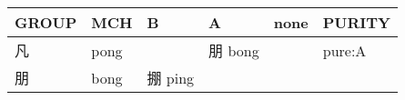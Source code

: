 \documentclass[14pt,a4paper]{scrartcl}
\begin{document}
\begin{longtable}[c]{@{}llllll@{}}
\toprule
\begin{minipage}[b]{0.14\columnwidth}\raggedright\strut
GROUP
\strut\end{minipage} &
\begin{minipage}[b]{0.14\columnwidth}\raggedright\strut
MCH
\strut\end{minipage} &
\begin{minipage}[b]{0.14\columnwidth}\raggedright\strut
B
\strut\end{minipage} &
\begin{minipage}[b]{0.14\columnwidth}\raggedright\strut
A
\strut\end{minipage} &
\begin{minipage}[b]{0.14\columnwidth}\raggedright\strut
none
\strut\end{minipage} &
\begin{minipage}[b]{0.14\columnwidth}\raggedright\strut
PURITY
\strut\end{minipage}\tabularnewline
\midrule
\endhead
\begin{minipage}[t]{0.14\columnwidth}\raggedright\strut
凡
\strut\end{minipage} &
\begin{minipage}[t]{0.14\columnwidth}\raggedright\strut
pong
\strut\end{minipage} &
\begin{minipage}[t]{0.14\columnwidth}\raggedright\strut
\strut\end{minipage} &
\begin{minipage}[t]{0.14\columnwidth}\raggedright\strut
朋 bong
\strut\end{minipage} &
\begin{minipage}[t]{0.14\columnwidth}\raggedright\strut
\strut\end{minipage} &
\begin{minipage}[t]{0.14\columnwidth}\raggedright\strut
pure:A
\strut\end{minipage}\tabularnewline
\begin{minipage}[t]{0.14\columnwidth}\raggedright\strut
朋
\strut\end{minipage} &
\begin{minipage}[t]{0.14\columnwidth}\raggedright\strut
bong
\strut\end{minipage} &
\begin{minipage}[t]{0.14\columnwidth}\raggedright\strut
掤 ping
\strut\end{minipage} &
\begin{minipage}[t]{0.14\columnwidth}\raggedright\strut

\end{minipage}
\end{longtable}
\end{document}
